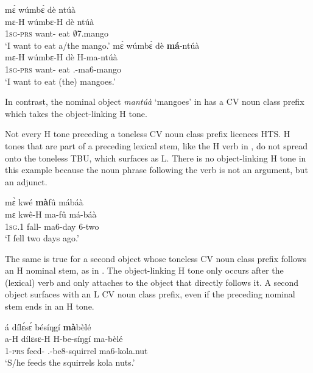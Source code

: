 \ea\label{HTSM}
  \ea \label{HTSM1}
  \glll    mɛ́ wúmbɛ́ dè ntúà  \\
	    mɛ-H wúmbɛ-H dè ntúà \\ 
              1\textsc{sg}-\textsc{prs} want-{\R} eat $\emptyset$7.mango   \\
    \trans `I want to eat a/the mango.'
\ex\label{HTSM2}
  \glll    mɛ́ wúmbɛ́ dè {\bfseries má}-ntúà  \\
	    mɛ-H wúmbɛ-H dè H-ma-ntúà \\ 
              1\textsc{sg}-\textsc{prs} want-{\R} eat {\OBJ}.{\LINK}-ma6-mango   \\
    \trans `I want to eat (the) mangoes.'
\z
\z

\noindent  In contrast, the nominal object {\itshape mantúà} `mangoes' in  has a CV noun class prefix which takes the object-linking H tone.

Not every H tone preceding a toneless CV noun class prefix licences HTS. H tones that are part of a preceding lexical stem, like the H verb in , do not spread onto the toneless TBU, which surfaces as L. There is no object-linking H tone in this example because the noun phrase following the verb is not an argument, but an adjunct.

\ea\label{HTSV}
  \ea \label{HTSV1}
  \glll    mɛ̀ kwé {\bfseries mà}fû mábáà  \\
	    mɛ kwê-H ma-fû má-báà \\ 
              1\textsc{sg}.{\PST}1 fall-{\PST} ma6-day 6-two  \\
    \trans `I fell two days ago.'
\z
\z

The same is true for a second object whose toneless CV noun class prefix follows an H nominal stem, as in . The object-linking H tone only occurs after the (lexical) verb and only attaches to the object that directly follows it. A second object surfaces with an L CV noun class prefix, even if the preceding nominal stem ends in an H tone.


\ea\label{HTSN}
  \ea \label{HTSN1}
  \glll    á dílɛ́sɛ́ bésíŋgí {\bfseries mà}bèlé  \\
	    a-H dílɛsɛ-H H-be-síŋgí ma-bèlé \\ 
             1-\textsc{prs} feed-{\R} {\OBJ}.{\LINK}-be8-squirrel ma6-kola.nut  \\
    \trans `S/he feeds the squirrels kola nuts.'
\z
\z



